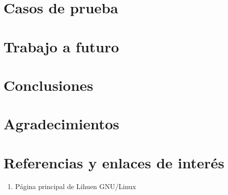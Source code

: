\documentclass[final,narroweqnarray,inline,twoside]{ieee}
\begin{document}
\section{Casos de prueba}

\section{Trabajo a futuro}

\section{Conclusiones}

\section{Agradecimientos}

\section{Referencias y enlaces de interés}

\begin{enumerate}
\item Página principal de Lihuen GNU/Linux\\
\\[Visitado el día 9 de enero de 2009]
\end{enumerate}
\end{document}
